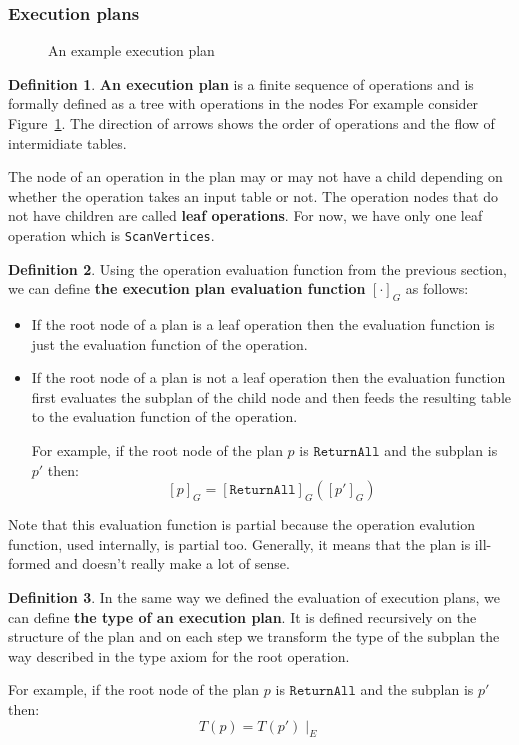 \documentclass[14pt]{constructor-thesis}
\theoremstyle{definition}
\newtheorem{definition}{Definition}
\begin{document}
\subsubsection{Execution plans}

\begin{figure}
  \centering
  
  \caption{An example execution plan}
  \label{fig:example-execution-plan}
\end{figure}

\begin{definition}
  \textbf{An execution plan} is a finite sequence of operations and is formally defined as a tree with operations in the nodes For example consider Figure~\ref{fig:example-execution-plan}. The direction of arrows shows the order of operations and the flow of intermidiate tables.

  The node of an operation in the plan may or may not have a child depending on whether the operation takes an input table or not. The operation nodes that do not have children are called \textbf{leaf operations}. For now, we have only one leaf operation which is \texttt{ScanVertices}.
\end{definition}

\begin{definition}
  Using the operation evaluation function from the previous section, we can define \textbf{the execution plan evaluation function} $[\cdot]_G$ as follows:
  \begin{itemize}
    \item If the root node of a plan is a leaf operation then the evaluation function is just the evaluation function of the operation.
    \item If the root node of a plan is not a leaf operation then the evaluation function first evaluates the subplan of the child node and then feeds the resulting table to the evaluation function of the operation.

    For example, if the root node of the plan $p$ is $\texttt{ReturnAll}$ and the subplan is $p'$ then:
    $$ [p]_G = [\texttt{ReturnAll}]_G ([p']_G) $$
  \end{itemize}
\end{definition}

Note that this evaluation function is partial because the operation evalution function, used internally, is partial too. Generally, it means that the plan is ill-formed and doesn't really make a lot of sense.

\begin{definition}
  In the same way we defined the evaluation of execution plans, we can define \textbf{the type of an execution plan}. It is defined recursively on the structure of the plan and on each step we transform the type of the subplan the way described in the type axiom for the root operation.
  
  For example, if the root node of the plan $p$ is $\texttt{ReturnAll}$ and the subplan is $p'$ then:
    $$ T(p) = T(p') \mid_E $$
\end{definition}
\end{document}
